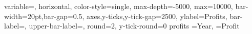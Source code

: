 \documentclass[12pt]{article}
\begin{document}
\DTLbarchart
{
 variable=\theProfit,
 horizontal,
 color-style=single,
 max-depth=-5000,
 max=10000,
 bar-width=20pt,bar-gap=0.5,
 axes,y-ticks,y-tick-gap=2500,
 ylabel=Profits,
 bar-label=\theYear,
 upper-bar-label=\DTLbarvalue,
 round=2,
 y-tick-round=0
}
{profits}%
 {%
 \theYear=Year,
 \theProfit=Profit
} 
\end{document}
